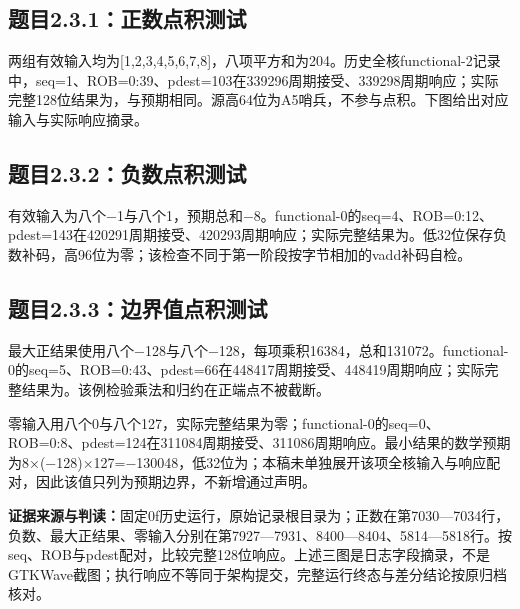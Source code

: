 \clearpage
\subsection{题目2.3.1：正数点积测试}
两组有效输入均为[1,2,3,4,5,6,7,8]，八项平方和为204。历史全核functional-2记录中，seq=1、ROB=0:39、pdest=103在339296周期接受、339298周期响应；实际完整128位结果为，与预期相同。源高64位为A5哨兵，不参与点积。下图给出对应输入与实际响应摘录。\par
{}
\subsection{题目2.3.2：负数点积测试}
有效输入为八个−1与八个1，预期总和−8。functional-0的seq=4、ROB=0:12、pdest=143在420291周期接受、420293周期响应；实际完整结果为。低32位保存负数补码，高96位为零；该检查不同于第一阶段按字节相加的vadd补码自检。\par
{}
\clearpage
\subsection{题目2.3.3：边界值点积测试}
最大正结果使用八个−128与八个−128，每项乘积16384，总和131072。functional-0的seq=5、ROB=0:43、pdest=66在448417周期接受、448419周期响应；实际完整结果为。该例检验乘法和归约在正端点不被截断。\par
{}
零输入用八个0与八个127，实际完整结果为零；functional-0的seq=0、ROB=0:8、pdest=124在311084周期接受、311086周期响应。最小结果的数学预期为8×(−128)×127=−130048，低32位为；本稿未单独展开该项全核输入与响应配对，因此该值只列为预期边界，不新增通过声明。\par
\noindent\textbf{证据来源与判读：}固定0f历史运行，原始记录根目录为；正数在第7030—7034行，负数、最大正结果、零输入分别在第7927—7931、8400—8404、5814—5818行。按seq、ROB与pdest配对，比较完整128位响应。上述三图是日志字段摘录，不是GTKWave截图；执行响应不等同于架构提交，完整运行终态与差分结论按原归档核对。\par

